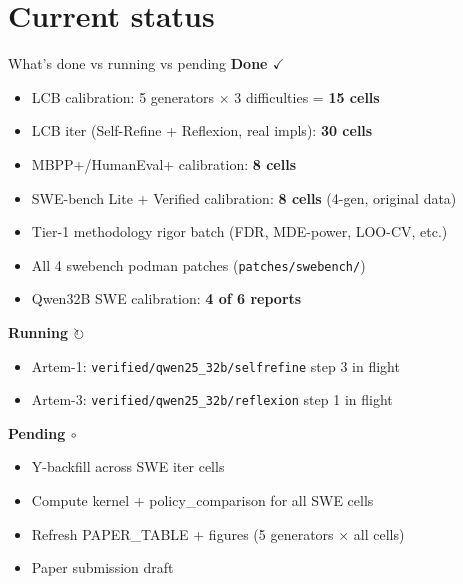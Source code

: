 \documentclass[10pt]{beamer}
\newcommand{\good}[1]{\textcolor{accentGreen}{\textbf{#1}}}
\newcommand{\done}{\textcolor{accentGreen}{$\checkmark$}}
\newcommand{\running}{\textcolor{accentOrange}{$\circlearrowright$}}
\newcommand{\pending}{\textcolor{softGrey}{$\circ$}}
\begin{document}
\section{Current status}

\begin{frame}{What's done vs running vs pending}
\vspace{0.1cm}
\textcolor{accentGreen}{\textbf{Done \done}}
\begin{itemize}\itemsep0pt\small
\item LCB calibration: 5 generators $\times$ 3 difficulties = \good{15 cells}
\item LCB iter (Self-Refine + Reflexion, real impls): \good{30 cells}
\item MBPP+/HumanEval+ calibration: \good{8 cells}
\item SWE-bench Lite + Verified calibration: \good{8 cells} (4-gen, original data)
\item Tier-1 methodology rigor batch (FDR, MDE-power, LOO-CV, etc.)
\item All 4 swebench podman patches (\texttt{patches/swebench/})
\item Qwen32B SWE calibration: \good{4 of 6 reports}
\end{itemize}
\textcolor{accentOrange}{\textbf{Running \running}}
\begin{itemize}\itemsep0pt\small
\item Artem-1: \texttt{verified/qwen25\_32b/selfrefine} step 3 in flight
\item Artem-3: \texttt{verified/qwen25\_32b/reflexion} step 1 in flight
\end{itemize}
\textcolor{softGrey}{\textbf{Pending \pending}}
\begin{itemize}\itemsep0pt\small
\item Y-backfill across SWE iter cells
\item Compute kernel + policy\_comparison for all SWE cells
\item Refresh PAPER\_TABLE + figures (5 generators $\times$ all cells)
\item Paper submission draft
\end{itemize}
\end{frame}
\end{document}
